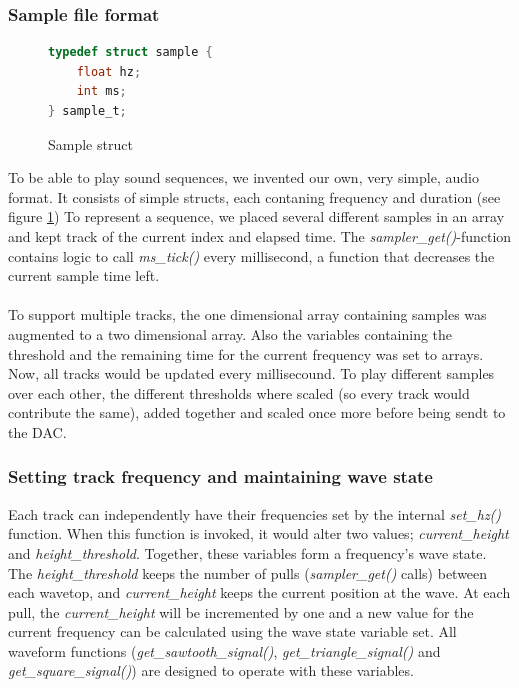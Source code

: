 \subsubsection{Sample file format}
\begin{figure}[h]
	\centering
	\begin{lstlisting}[language=C]
typedef struct sample {
	float hz;
	int ms;
} sample_t;
	\end{lstlisting}
	\caption{Sample struct}
	\label{file_format_struct}
\end{figure}
To be able to play sound sequences, we invented our own, very simple, audio format. It consists of simple structs, each contaning frequency and duration (see figure \ref{file_format_struct}) To represent a sequence, we placed several different samples in an array and kept track of the current index and elapsed time. The \emph{sampler\_get()}-function contains logic to call \emph{ms\_tick()} every millisecond, a function that decreases the current sample time left.\\
\\
To support multiple tracks, the one dimensional array containing samples was augmented to a two dimensional array. Also the variables containing the threshold and the remaining time for the current frequency was set to arrays. Now, all tracks would be updated every millisecound. To play different samples over each other, the different thresholds where scaled (so every track would contribute the same), added together and scaled once more before being sendt to the DAC.

\subsubsection{Setting track frequency and maintaining wave state}
Each track can independently have their frequencies set by the internal \emph{set\_hz()} function. When this function is invoked, it would alter two values; \emph{current\_height} and \emph{height\_threshold}. Together, these variables form a frequency's wave state. The \emph{height\_threshold} keeps the number of pulls (\emph{sampler\_get()} calls) between each wavetop, and \emph{current\_height} keeps the current position at the wave. At each pull, the \emph{current\_height} will be incremented by one and a new value for the current frequency can be calculated using the wave state variable set. All waveform functions (\emph{get\_sawtooth\_signal()}, \emph{get\_triangle\_signal()} and \emph{get\_square\_signal()}) are designed to operate with these variables.

